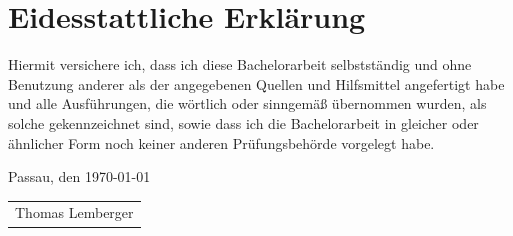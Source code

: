 \documentclass[abstracton,bibliography=totoc,version=last,fontsize=12pt,BCOR=5mm,footinclude=false,a4paper,final,ngerman]{scrreprt}
\providecommand{\backmatter}{}
\begin{document}
\backmatter
\appendix


\chapter*{Eidesstattliche Erkl\"{a}rung}
\thispagestyle{empty}
Hiermit versichere ich, dass ich diese Bachelorarbeit selbstst\"{a}ndig und ohne
Benutzung anderer als der angegebenen Quellen und Hilfsmittel angefertigt habe
und alle Ausf\"{u}hrungen, die w\"{o}rtlich oder sinngem\"{a}\ss{} \"{u}bernommen wurden, als
solche gekennzeichnet sind, sowie dass ich die Bachelorarbeit in gleicher oder
\"{a}hnlicher Form noch keiner anderen Pr\"{u}fungsbeh\"{o}rde vorgelegt habe.

\bigskip

\noindent Passau, den \today

\bigskip\bigskip\bigskip
\noindent \begin{tabular}{c}
\hspace*{0.5\linewidth}\\
\hline
Thomas Lemberger
\end{tabular}
\end{document}

